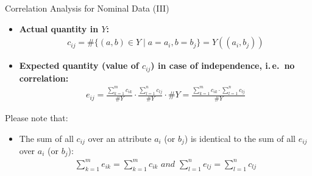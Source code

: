 \begin{frame}{Correlation Analysis for Nominal Data (III)}
	\begin{itemize}
		\item \textbf{Actual quantity in $Y$:}
		      \begin{align*}
			      c_{ij} = \#\{(a,b) \in Y \; \vert \; a = a_i, b= b_j\}
			      = Y((a_i, b_j))
		      \end{align*}
		\item \textbf{Expected quantity (value of $c_{ij}$) in case of
			      independence, i.\,e.\ no correlation:}
		      \begin{align*}
			      e_{ij} = \frac{\sum_{k=1}^{m} c_{ik}}{\#Y} \cdot
			      \frac{\sum_{l=1}^{n}c_{lj}}{\#Y} \cdot \#Y
			      = \frac{\sum_{k=1}^{m} c_{ik} \cdot \sum_{l=1}^{n}c_{lj}}{\#Y}
		      \end{align*}
	\end{itemize}

	\begin{block}{Please note that:}
		\begin{itemize}
			\item The sum of all $c_{ij}$ over an attribute $a_i$ (or $b_j$) is
			      identical to the sum of all $e_{ij}$ over $a_i$ (or $b_j$):
			      \vspace{-2mm}
			      \begin{align*}
				      \sum_{k=1}^{m} e_{ik} = \sum_{k=1}^{m} c_{ik}
				      \textit{ and }
				      \sum_{l=1}^{n} e_{lj} = \sum_{l=1}^{n} c_{lj}
			      \end{align*}
		\end{itemize}
	\end{block}
\end{frame}


